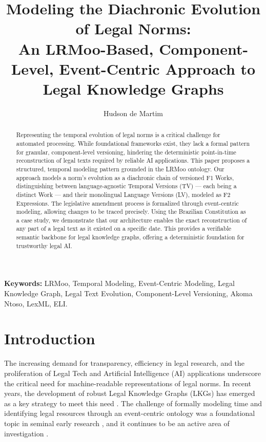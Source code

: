 \documentclass[11pt]{article}
\title{Modeling the Diachronic Evolution of Legal Norms: \\An LRMoo-Based, Component-Level, Event-Centric Approach to Legal Knowledge Graphs}
\author[1]{Hudson de Martim}
\affil[1]{Federal Senate of Brazil \\ \texttt{hudsonm@senado.leg.br}}
\date{} %
\begin{document}
\maketitle

\begin{abstract}
Representing the temporal evolution of legal norms is a critical challenge for automated processing. While foundational frameworks exist, they lack a formal pattern for granular, component-level versioning, hindering the deterministic point-in-time reconstruction of legal texts required by reliable AI applications. This paper proposes a structured, temporal modeling pattern grounded in the LRMoo ontology. Our approach models a norm's evolution as a diachronic chain of versioned F1 Works, distinguishing between language-agnostic Temporal Versions (TV) — each being a distinct Work — and their monolingual Language Versions (LV), modeled as F2 Expressions. The legislative amendment process is formalized through event-centric modeling, allowing changes to be traced precisely. Using the Brazilian Constitution as a case study, we demonstrate that our architecture enables the exact reconstruction of any part of a legal text as it existed on a specific date. This provides a verifiable semantic backbone for legal knowledge graphs, offering a deterministic foundation for trustworthy legal AI.
\end{abstract}

\noindent\textbf{Keywords:} LRMoo, Temporal Modeling, Event-Centric Modeling, Legal Knowledge Graph, Legal Text Evolution, Component-Level Versioning, Akoma Ntoso, LexML, ELI.

\section{Introduction}
The increasing demand for transparency, efficiency in legal research, and the proliferation of Legal Tech and Artificial Intelligence (AI) applications underscore the critical need for machine-readable representations of legal norms. In recent years, the development of robust Legal Knowledge Graphs (LKGs) has emerged as a key strategy to meet this need \cite{louis2024interpretable,moens2007automatic}. The challenge of formally modeling time and identifying legal resources through an event-centric ontology was a foundational topic in seminal early research \cite{lima2008ontology}, and it continues to be an active area of investigation \cite{kucuk2025computational,chen2023temporal,cai2024survey}.
\end{document}
